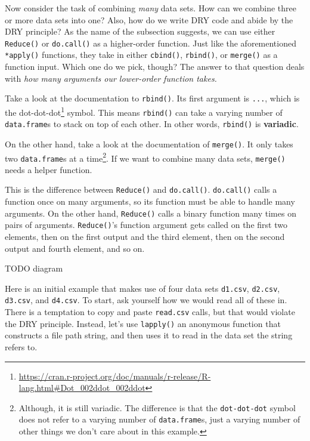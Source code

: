 \documentclass[
  12pt,
  krantz2]{krantz}
\renewcommand{\href}[2]{#2\footnote{\url{#1}}}
\begin{document}
Now consider the task of combining \emph{many} data sets. How can we combine three or more data sets into one? Also, how do we write DRY code and abide by the DRY principle? As the name of the subsection suggests, we can use either \texttt{Reduce()} or \texttt{do.call()} as a higher-order function. Just like the aforementioned \texttt{*apply()} functions, they take in either \texttt{cbind()}, \texttt{rbind()}, or \texttt{merge()} as a function input. Which one do we pick, though? The answer to that question deals with \emph{how many arguments our lower-order function takes.}

Take a look at the documentation to \texttt{rbind()}. Its first argument is \texttt{...}, which is the \href{https://cran.r-project.org/doc/manuals/r-release/R-lang.html\#Dot_002ddot_002ddot}{dot-dot-dot} symbol. This means \texttt{rbind()} can take a varying number of \texttt{data.frame}s to stack on top of each other. In other words, \texttt{rbind()} is \textbf{variadic}.

On the other hand, take a look at the documentation of \texttt{merge()}. It only takes two \texttt{data.frame}s at a time\footnote{Although, it is still variadic. The difference is that the \texttt{dot-dot-dot} symbol does not refer to a varying number of \texttt{data.frame}s, just a varying number of other things we don't care about in this example.}. If we want to combine many data sets, \texttt{merge()} needs a helper function.

This is the difference between \texttt{Reduce()} and \texttt{do.call()}. \texttt{do.call()} calls a function once on many arguments, so its function must be able to handle many arguments. On the other hand, \texttt{Reduce()} calls a binary function many times on pairs of arguments. \texttt{Reduce()}'s function argument gets called on the first two elements, then on the first output and the third element, then on the second output and fourth element, and so on.

TODO diagram

Here is an initial example that makes use of four data sets \texttt{d1.csv}, \texttt{d2.csv}, \texttt{d3.csv}, and \texttt{d4.csv}. To start, ask yourself how we would read all of these in. There is a temptation to copy and paste \texttt{read.csv} calls, but that would violate the DRY principle. Instead, let's use \texttt{lapply()} an anonymous function that constructs a file path string, and then uses it to read in the data set the string refers to.
\end{document}
